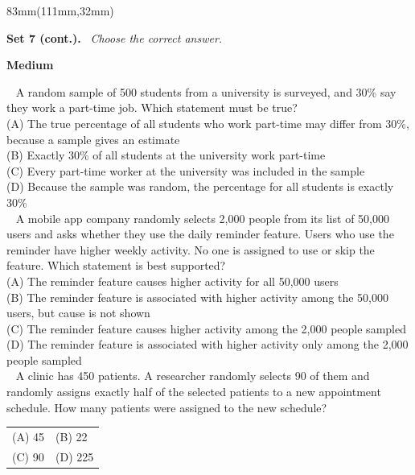 \documentclass[a4paper]{article}
\makeatletter
\newcommand{\RCOL}{111mm}
\newcommand{\COLW}{83mm}
\newcommand{\setkicker}[2]{%
{\sffamily\bfseries\fontsize{12}{14}\selectfont #1.}\ {\itshape\fontsize{11}{14}\selectfont\color{black!75} #2}\par\vspace{2mm}%
}
\newcommand{\pnum}[1]{\fcolorbox{ink}{white}{\sffamily\bfseries\fontsize{8}{8}\selectfont #1}~}
\newcommand{\satq}[6]{%
\noindent\pnum{#1} #2\\[2mm]
\hspace*{7mm}\begin{tabular}{@{}p{32mm}p{32mm}@{}}
(A) #3 & (B) #4 \\[2.5mm]
(C) #5 & (D) #6 \\
\end{tabular}\\[7mm]%
}
\newcommand{\satqw}[6]{%
\noindent\pnum{#1} #2\\[2mm]
\hspace*{7mm}(A) #3\\[1.6mm]
\hspace*{7mm}(B) #4\\[1.6mm]
\hspace*{7mm}(C) #5\\[1.6mm]
\hspace*{7mm}(D) #6\\[7mm]%
}
\makeatother
\begin{document}
\begin{textblock*}{\COLW}(\RCOL,32mm)
{\fontsize{10.3}{13}\selectfont
\setkicker{Set 7 (cont.)}{Choose the correct answer.}
{\sffamily\bfseries\color{accent}\fontsize{10.5}{12}\selectfont Medium}\par\vspace{1.5mm}
\satqw{7}{A random sample of 500 students from a university is surveyed, and 30\% say they work a part-time job. Which statement must be true?}{The true percentage of all students who work part-time may differ from 30\%, because a sample gives an estimate}{Exactly 30\% of all students at the university work part-time}{Every part-time worker at the university was included in the sample}{Because the sample was random, the percentage for all students is exactly 30\%}
\satqw{8}{A mobile app company randomly selects 2,000 people from its list of 50,000 users and asks whether they use the daily reminder feature. Users who use the reminder have higher weekly activity. No one is assigned to use or skip the feature. Which statement is best supported?}{The reminder feature causes higher activity for all 50,000 users}{The reminder feature is associated with higher activity among the 50,000 users, but cause is not shown}{The reminder feature causes higher activity among the 2,000 people sampled}{The reminder feature is associated with higher activity only among the 2,000 people sampled}
\satq{9}{A clinic has 450 patients. A researcher randomly selects 90 of them and randomly assigns exactly half of the selected patients to a new appointment schedule. How many patients were assigned to the new schedule?}{45}{22}{90}{225}
}
\end{textblock*}
\clearpage
\end{document}
